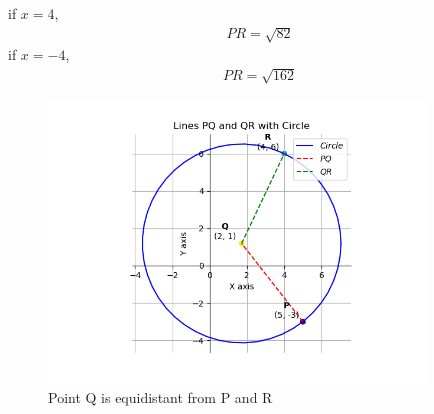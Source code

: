 \documentclass[journal]{IEEEtran}
\begin{document}
if $x=4$,
\begin{align}
    PR=\sqrt{82}
\end{align}
if $x=-4$,
\begin{align}
    PR=\sqrt{162}
\end{align}
\begin{figure}[htp]
    \centering
    \includegraphics[width=10cm]{figs/Figure_1.png}
    \caption{Point Q is equidistant from P and R}
    \label{stemplot}
\end{figure}
\end{document}
